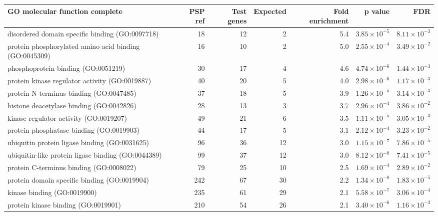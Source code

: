 \begin{table}[ht]
\centering
\begin{adjustbox}{width=\textwidth}

\begin{tabular}{lrrrrrr}
  \hline
GO molecular function complete & PSP ref & Test genes & Expected & Fold enrichment & p value & FDR \\ 
  \hline
disordered domain specific binding (GO:0097718) & 18 & 12 & 2 & 5.4 & $3.85 \times 10^{-5}$ & $8.11 \times 10^{-3}$ \\ 
  protein phosphorylated amino acid binding (GO:0045309) & 16 & 10 & 2 & 5.0 & $2.55 \times 10^{-4}$ & $3.49 \times 10^{-2}$ \\ 
  phosphoprotein binding (GO:0051219) & 30 & 17 & 4 & 4.6 & $4.74 \times 10^{-6}$ & $1.44 \times 10^{-3}$ \\ 
  protein kinase regulator activity (GO:0019887) & 40 & 20 & 5 & 4.0 & $2.98 \times 10^{-6}$ & $1.17 \times 10^{-3}$ \\ 
  protein N-terminus binding (GO:0047485) & 37 & 18 & 5 & 3.9 & $1.26 \times 10^{-5}$ & $3.14 \times 10^{-3}$ \\ 
  histone deacetylase binding (GO:0042826) & 28 & 13 & 3 & 3.7 & $2.96 \times 10^{-4}$ & $3.86 \times 10^{-2}$ \\ 
  kinase regulator activity (GO:0019207) & 49 & 21 & 6 & 3.5 & $1.11 \times 10^{-5}$ & $3.05 \times 10^{-3}$ \\ 
  protein phosphatase binding (GO:0019903) & 44 & 17 & 5 & 3.1 & $2.12 \times 10^{-4}$ & $3.23 \times 10^{-2}$ \\ 
  ubiquitin protein ligase binding (GO:0031625) & 96 & 36 & 12 & 3.0 & $1.15 \times 10^{-7}$ & $7.86 \times 10^{-5}$ \\ 
  ubiquitin-like protein ligase binding (GO:0044389) & 99 & 37 & 12 & 3.0 & $8.12 \times 10^{-8}$ & $7.41 \times 10^{-5}$ \\ 
  protein C-terminus binding (GO:0008022) & 79 & 25 & 10 & 2.5 & $1.69 \times 10^{-4}$ & $2.89 \times 10^{-2}$ \\ 
  protein domain specific binding (GO:0019904) & 242 & 67 & 30 & 2.2 & $1.34 \times 10^{-8}$ & $1.83 \times 10^{-5}$ \\ 
  kinase binding (GO:0019900) & 235 & 61 & 29 & 2.1 & $5.58 \times 10^{-7}$ & $3.06 \times 10^{-4}$ \\ 
  protein kinase binding (GO:0019901) & 210 & 54 & 26 & 2.1 & $3.40 \times 10^{-6}$ & $1.16 \times 10^{-3}$ \\ 

\end{tabular}
\end{adjustbox}
\end{table}
